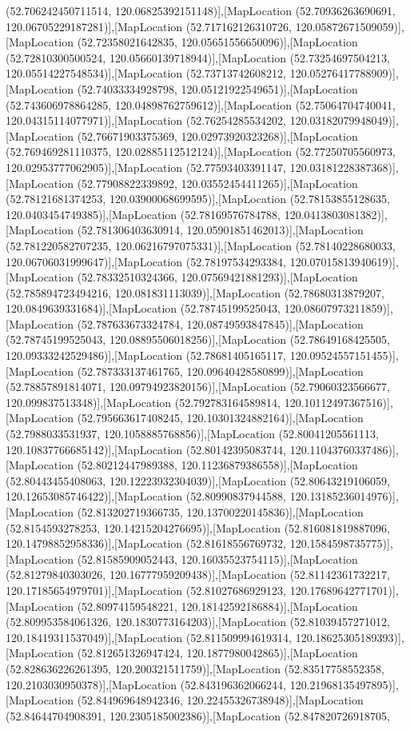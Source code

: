 (52.706242450711514, 120.06825392151148)],[MapLocation (52.70936263690691, 120.06705229187281)],[MapLocation (52.717162126310726, 120.05872671509059)],[MapLocation (52.72358021642835, 120.05651556650096)],[MapLocation (52.72810300500524, 120.05660139718944)],[MapLocation (52.73254697504213, 120.05514227548534)],[MapLocation (52.73713742608212, 120.05276417788909)],[MapLocation (52.74033334928798, 120.05121922549651)],[MapLocation (52.743606978864285, 120.04898762759612)],[MapLocation (52.75064704740041, 120.04315114077971)],[MapLocation (52.76254285534202, 120.03182079948049)],[MapLocation (52.76671903375369, 120.02973920323268)],[MapLocation (52.769469281110375, 120.02885112512124)],[MapLocation (52.77250705560973, 120.02953777062905)],[MapLocation (52.77593403391147, 120.03181228387368)],[MapLocation (52.77908822339892, 120.03552454411265)],[MapLocation (52.78121681374253, 120.03900068699595)],[MapLocation (52.78153855128635, 120.0403454749385)],[MapLocation (52.78169576784788, 120.0413803081382)],[MapLocation (52.781306403630914, 120.05901851462013)],[MapLocation (52.781220582707235, 120.06216797075331)],[MapLocation (52.78140228680033, 120.06706031999647)],[MapLocation (52.78197534293384, 120.07015813940619)],[MapLocation (52.78332510324366, 120.07569421881293)],[MapLocation (52.785894723494216, 120.081831113039)],[MapLocation (52.78680313879207, 120.0849639331684)],[MapLocation (52.78745199525043, 120.08607973211859)],[MapLocation (52.787633673324784, 120.08749593847845)],[MapLocation (52.78745199525043, 120.08895506018256)],[MapLocation (52.78649168425505, 120.09333242529486)],[MapLocation (52.78681405165117, 120.09524557151455)],[MapLocation (52.787333137461765, 120.09640428580899)],[MapLocation (52.78857891814071, 120.09794923820156)],[MapLocation (52.79060323566677, 120.099837513348)],[MapLocation (52.792783164589814, 120.10112497367516)],[MapLocation (52.795663617408245, 120.10301324882164)],[MapLocation (52.7988033531937, 120.1058885768856)],[MapLocation (52.80041205561113, 120.10837766685142)],[MapLocation (52.80142395083744, 120.11043760337486)],[MapLocation (52.80212447989388, 120.11236879386558)],[MapLocation (52.80443455408063, 120.12223932304039)],[MapLocation (52.80643219106059, 120.12653085746422)],[MapLocation (52.80990837944588, 120.13185236014976)],[MapLocation (52.813202719366735, 120.13700220145836)],[MapLocation (52.8154593278253, 120.14215204276695)],[MapLocation (52.816081819887096, 120.14798852958336)],[MapLocation (52.81618556769732, 120.1584598735775)],[MapLocation (52.81585909052443, 120.16035523754115)],[MapLocation (52.81279840303026, 120.16777959209438)],[MapLocation (52.81142361732217, 120.17185654979701)],[MapLocation (52.81027686929123, 120.17689642771701)],[MapLocation (52.80974159548221, 120.18142592186884)],[MapLocation (52.809953584061326, 120.1830773164203)],[MapLocation (52.81039457271012, 120.18419311537049)],[MapLocation (52.811509994619314, 120.18625305189393)],[MapLocation (52.812651326947424, 120.1877980042865)],[MapLocation (52.828636226261395, 120.200321511759)],[MapLocation (52.83517758552358, 120.2103030950378)],[MapLocation (52.843196362066244, 120.21968135497895)],[MapLocation (52.844969648942346, 120.22455326738948)],[MapLocation (52.84644704908391, 120.2305185002386)],[MapLocation (52.847820726918705, 